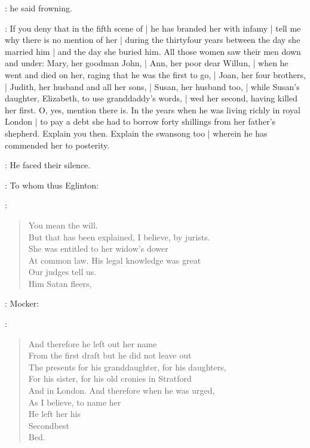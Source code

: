 :
he said frowning.

\Stephen:
If you deny that in the fifth scene of  |
he has branded her with infamy |
tell me why there is no mention of her |
during the thirtyfour years between the day she married him |
and the day she buried him.
All those women saw their men down and under:
Mary, her goodman John, |
Ann, her poor dear Willun, |
when he went and died on her,
raging that he was the first to go, |
Joan, her four brothers, |
Judith, her husband and all her sons, |
Susan, her husband too, |
while Susan's daughter,
Elizabeth,
to use granddaddy's words, |
wed her second,
having killed her first.
O, yes,
mention there is.
In the years when he was living richly in royal London |
to pay a debt she had to borrow forty shillings from her father's shepherd.
Explain you then.
Explain the swansong too |
wherein he has commended her to posterity.

:
He faced their silence.

: To whom thus Eglinton:

\eglinton:
\begin{verse}
You mean the will. \\
    But that has been explained, I believe, by jurists. \\
    She was entitled to her widow's dower \\
    At common law. His legal knowledge was great \\
    Our judges tell us. \\
        Him Satan fleers, \\
\end{verse}

: Mocker:

\Stephen:
\begin{verse}
        And therefore he left out her name \\
    From the first draft but he did not leave out \\
    The presents for his granddaughter, for his daughters, \\
    For his sister, for his old cronies in Stratford \\
    And in London. And therefore when he was urged, \\
    As I believe, to name her \\
    He left her his \\
    Secondbest \\
    Bed.
\end{verse}

